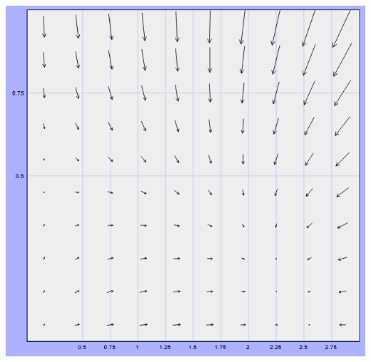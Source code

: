 \documentclass[a4paper,fleqn,12pt]{article}
\begin{document}
\begin{center}
\includegraphics [width=6in]{fazof-portret-primer-1.png}
\end{center}

\newpage
\end{document}
